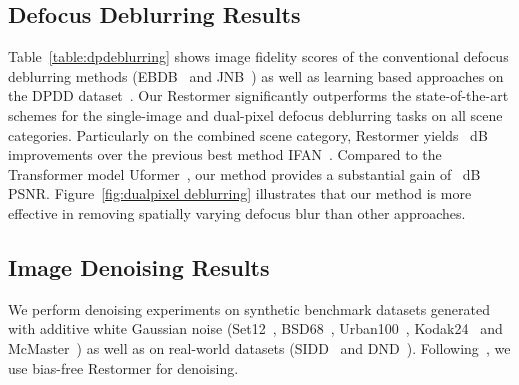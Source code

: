 \documentclass[10pt,twocolumn,letterpaper]{article}
\def\xnet{Restormer\xspace}
\begin{document}
\subsection{Defocus Deblurring Results}
Table~\ref{table:dpdeblurring} shows image fidelity scores of the conventional defocus deblurring methods (EBDB~\cite{karaali2017edge_EBDB} and JNB~\cite{shi2015just_jnb}) as well as learning based approaches on the DPDD dataset~\cite{abdullah2020dpdd}. 
Our \xnet significantly outperforms the state-of-the-art schemes for the single-image and dual-pixel defocus deblurring tasks on all scene categories. 
Particularly on the combined scene category, \xnet yields ~dB improvements over the previous best method IFAN~\cite{Lee_2021_CVPRifan}. 
Compared to the Transformer model Uformer~\cite{wang2021uformer}, our method provides a substantial gain of ~dB PSNR. Figure~\ref{fig:dualpixel deblurring} illustrates that our method is more effective in removing spatially varying defocus blur than other approaches. 






\subsection{Image Denoising Results}
We perform denoising experiments on synthetic benchmark datasets generated with additive white Gaussian noise (Set12~\cite{DnCNN}, BSD68~\cite{martin2001database_bsd}, Urban100~\cite{huang2015single_urban100}, Kodak24~\cite{kodak} and McMaster~\cite{zhang2011color_mcmaster}) as well as on real-world datasets (SIDD~\cite{sidd} and DND~\cite{dnd}). Following~\cite{mohan2019robust_biasfree,zhang2021DPIR,Zamir_2021_CVPR_mprnet}, we use bias-free \xnet for denoising.
\end{document}
